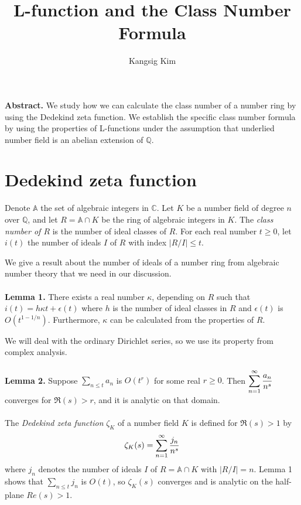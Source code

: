 \documentclass[11pt]{article}
\title{L-function and the Class Number Formula}
\author{Kangsig Kim}
\begin{document}
\maketitle

\textbf{Abstract.}
We study how we can calculate the class number of a number ring by using the Dedekind zeta function. We establish the specific class number formula by using the properties of L-functions under the assumption that underlied number field is an abelian extension of $\mathbb{Q}$.
\vspace{10mm}

\section{Dedekind zeta function}
Denote $\mathbb{A}$ the set of algebraic integers in $\mathbb{C}$. Let $K$ be a number field of degree $n$ over $\mathbb{Q}$, and let $R=\mathbb{A}\cap K$ be the ring of algebraic integers in $K$. The \textit{class number of $R$} is the number of ideal classes of $R$. For each real number $t\geq0$, let $i(t)$ the number of ideals $I$ of $R$ with index $|R/I|\leq t$.

We give a result about the number of ideals of a number ring from algebraic number theory that we need in our discussion.
\\
\\
\textbf{Lemma 1.}
There exists a real number $\kappa$, depending on $R$ such that $i(t)=h\kappa t+\epsilon(t)$ where $h$ is the number of ideal classes in $R$ and $\epsilon(t)$ is $O(t^{1-1/n})$. Furthermore, $\kappa$ can be calculated from the properties of $R$.
\vspace{5mm}
\par
We will deal with the ordinary Dirichlet series, so we use its property from complex analysis.
\\
\\
\textbf{Lemma 2.}
Suppose $\sum_{n\leq t}a_n$ is $O(t^r)$ for some real $r\geq0$. Then $\displaystyle\sum_{n=1}^{\infty}{a_n\over n^s}$ converges for $\Re(s)>r$, and it is analytic on that domain.
\\
\\

The \textit{Dedekind zeta function} $\zeta_K$ of a number field $K$ is defined for $\Re(s)>1$ by
\begin{equation*}
\zeta_K(s)=\displaystyle\sum_{n=1}^{\infty}{j_n\over n^s}
\end{equation*}
where $j_n$ denotes the number of ideals $I$ of $R=\mathbb{A}\cap K$ with $|R/I|=n$. Lemma 1 shows that $\sum_{n\leq t}j_n$ is $O(t)$, so $\zeta_K(s)$ converges and is analytic on the half-plane $Re(s)>1$.
\end{document}
